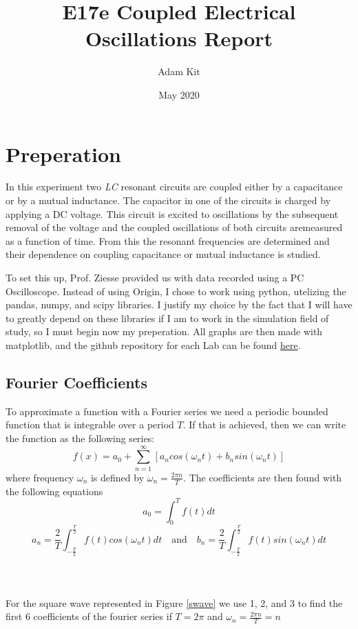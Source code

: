 \documentclass{article}
\title{E17e Coupled Electrical Oscillations Report}
\author{Adam Kit}
\date{May 2020}
\begin{document}
\maketitle

\section*{Preperation}
In this experiment two \textit{LC} resonant circuits are coupled either by a capacitance or by a mutual inductance. The capacitor in one of the circuits is charged by applying a DC voltage. This circuit is excited to oscillations by the subsequent removal of the voltage and the coupled oscillations of both circuits aremeasured as a function of time. From this the resonant frequencies are determined and their dependence on coupling capacitance or mutual inductance is studied.

To set this up, Prof. Ziesse provided us with data recorded using a PC Oscilloscope. Instead of using Origin, I chose to work using python, utelizing the pandas, numpy, and scipy libraries. I justify my choice by the fact that I will have to greatly depend on these libraries if I am to work in the simulation field of study, so I must begin now my preperation. All graphs are then made with matplotlib, and the github repository for each Lab can be found \href{https://github.com/fusionby2030/Numerical_Methods/tree/master/Labs/E17e}{here}.
\subsection{Fourier  Coefficients}
To approximate a function with a Fourier series we need a periodic bounded function that is integrable over a period $T$. If that is achieved, then we can write the function as the following series:
\begin{equation}
f(x) = a_0 + \sum_{n=1}^{\infty}[a_n cos(\omega_n t)+ b_nsin(\omega_n t)]
\end{equation}
where frequency $\omega_n$ is defined by $\omega_n = \frac{2 \pi n}{T}$. The coefficients are then found with the following equations
\begin{equation}
a_0 = \int_0^T f(t)dt
\end{equation}
\begin{equation}
a_n = \frac{2}{T}\int_{-\frac{T}{2}}^{\frac{T}{2}} f(t)cos(\omega_nt)dt
  \quad\text{and}\quad
b_n = \frac{2}{T}\int_{-\frac{T}{2}}^{\frac{T}{2}} f(t)sin(\omega_nt)dt
\end{equation}
\\ \\ \\
For the square wave represented in Figure \ref{swave} we use 1, 2, and 3 to find the first 6 coefficients of the fourier series if $T = 2\pi$ and $\omega_n = \frac{2 \pi n}{T} = n$
\end{document}
